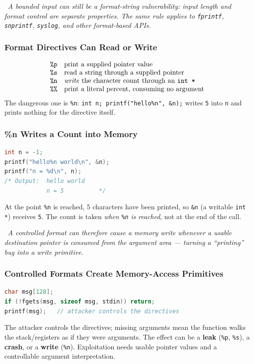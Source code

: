 \documentclass[hidelinks]{article}
\newcommand{\callout}[1]{\par\smallskip\noindent{\color{capri}$\blacktriangleright$}\ \textit{#1}\par\smallskip}
\begin{document}
\callout{A \emph{bounded} input can still be a format-string vulnerability: input length and format control are separate properties. The same rule applies to \texttt{fprintf}, \texttt{snprintf}, \texttt{syslog}, and other format-based APIs.}

\subsubsection{Format Directives Can Read or Write}

\[
\begin{array}{ll}
\texttt{\%p} & \text{print a supplied pointer value}\\
\texttt{\%s} & \text{read a string through a supplied pointer}\\
\texttt{\%n} & \text{\emph{write} the character count through an \texttt{int *}}\\
\texttt{\%\%} & \text{print a literal percent, consuming no argument}\\
\end{array}
\]
The dangerous one is \texttt{\%n}: \texttt{int n; printf("hello\%n", \&n);} writes \texttt{5} into \texttt{n} and prints nothing for the directive itself.

\subsubsection{\%n Writes a Count into Memory}

\begin{lstlisting}[language=C]
int n = -1;
printf("hello%n world\n", &n);
printf("n = %d\n", n);
/* Output:  hello world
            n = 5          */
\end{lstlisting}
At the point \texttt{\%n} is reached, 5 characters have been printed, so \texttt{\&n} (a writable \texttt{int *}) receives \texttt{5}. The count is taken \emph{when \texttt{\%n} is reached}, not at the end of the call.

\callout{A controlled format can therefore cause a \emph{memory write} whenever a usable destination pointer is consumed from the argument area --- turning a ``printing'' bug into a write primitive.}

\subsubsection{Controlled Formats Create Memory-Access Primitives}

\begin{lstlisting}[language=C]
char msg[128];
if (!fgets(msg, sizeof msg, stdin)) return;
printf(msg);   // attacker controls the directives
\end{lstlisting}
The attacker controls the directives; missing arguments mean the function walks the stack/registers as if they were arguments. The effect can be a \textbf{leak} (\texttt{\%p}, \texttt{\%s}), a \textbf{crash}, or a \textbf{write} (\texttt{\%n}). Exploitation needs usable pointer values and a controllable argument interpretation.
\end{document}
